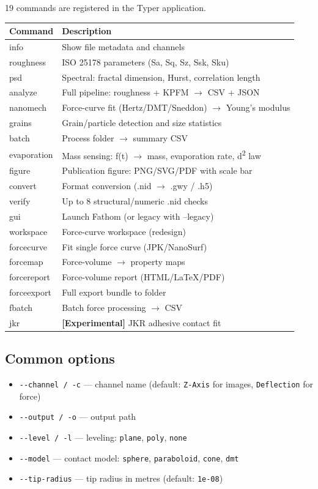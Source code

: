 \documentclass[a4paper,11pt]{article}
\begin{document}
19 commands are registered in the Typer application.

\begin{longtable}{@{}>{\ttfamily}l p{8.5cm}@{}}
\toprule
Command & Description \\
\midrule
info & Show file metadata and channels \\
roughness & ISO 25178 parameters (Sa, Sq, Sz, Ssk, Sku) \\
psd & Spectral: fractal dimension, Hurst, correlation length \\
analyze & Full pipeline: roughness + KPFM $\rightarrow$ CSV + JSON \\
nanomech & Force-curve fit (Hertz/DMT/Sneddon) $\rightarrow$ Young's modulus \\
grains & Grain/particle detection and size statistics \\
batch & Process folder $\rightarrow$ summary CSV \\
evaporation & Mass sensing: f(t) $\rightarrow$ mass, evaporation rate, d\textsuperscript{2} law \\
figure & Publication figure: PNG/SVG/PDF with scale bar \\
convert & Format conversion (.nid $\rightarrow$ .gwy / .h5) \\
verify & Up to 8 structural/numeric .nid checks \\
gui & Launch Fathom (or legacy with --legacy) \\
workspace & Force-curve workspace (redesign) \\
forcecurve & Fit single force curve (JPK/NanoSurf) \\
forcemap & Force-volume $\rightarrow$ property maps \\
forcereport & Force-volume report (HTML/LaTeX/PDF) \\
forceexport & Full export bundle to folder \\
fbatch & Batch force processing $\rightarrow$ CSV \\
jkr & \textbf{[Experimental]} JKR adhesive contact fit \\
\bottomrule
\end{longtable}

\subsection{Common options}
\begin{itemize}[nosep]
  \item \texttt{-{}-channel / -c} --- channel name (default: \texttt{Z-Axis} for images,
    \texttt{Deflection} for force)
  \item \texttt{-{}-output / -o} --- output path
  \item \texttt{-{}-level / -l} --- leveling: \texttt{plane}, \texttt{poly}, \texttt{none}
  \item \texttt{-{}-model} --- contact model: \texttt{sphere}, \texttt{paraboloid}, \texttt{cone}, \texttt{dmt}
  \item \texttt{-{}-tip-radius} --- tip radius in metres (default: \texttt{1e-08})
\end{itemize}
\end{document}
